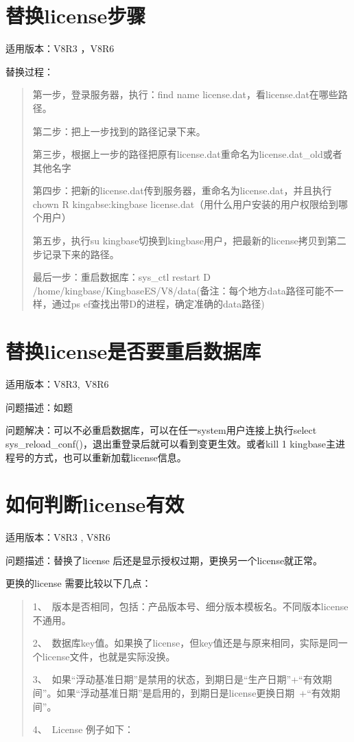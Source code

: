 \documentclass[letterpaper,10pt,english]{sphinxmanual}
\let\sphinxpxdimen\pdfpxdimen\else\newdimen\sphinxpxdimen
\begin{document}
\section{替换license步骤}
\label{\detokenize{license:id4}}
适用版本：V8R3 ，V8R6

替换过程：
\begin{quote}

第一步，登录服务器，执行：find \sphinxhyphen{}name license.dat，看license.dat在哪些路径。

第二步：把上一步找到的路径记录下来。

第三步，根据上一步的路径把原有license.dat重命名为license.dat\_old或者其他名字

第四步：把新的license.dat传到服务器，重命名为license.dat，并且执行chown \sphinxhyphen{}R kingabse:kingbase license.dat（用什么用户安装的用户权限给到哪个用户）

第五步，执行su \sphinxhyphen{}kingbase切换到kingbase用户，把最新的license拷贝到第二步记录下来的路径。

最后一步：重启数据库：sys\_ctl restart \sphinxhyphen{}D /home/kingbase/KingbaseES/V8/data(备注：每个地方data路径可能不一样，通过ps \sphinxhyphen{}ef查找出带\sphinxhyphen{}D的进程，确定准确的data路径)
\end{quote}


\section{替换license是否要重启数据库}
\label{\detokenize{license:id5}}
适用版本：V8R3, V8R6

问题描述：如题

问题解决：可以不必重启数据库，可以在任一system用户连接上执行select sys\_reload\_conf()，退出重登录后就可以看到变更生效。或者kill \sphinxhyphen{}1 kingbase主进程号的方式，也可以重新加载license信息。


\section{如何判断license有效}
\label{\detokenize{license:id6}}
适用版本：V8R3 , V8R6

问题描述：替换了license 后还是显示授权过期，更换另一个license就正常。

更换的license 需要比较以下几点：
\begin{quote}

1、 版本是否相同，包括：产品版本号、细分版本模板名。不同版本license不通用。

2、 数据库key值。如果换了license，但key值还是与原来相同，实际是同一个license文件，也就是实际没换。

3、 如果“浮动基准日期”是禁用的状态，到期日是“生产日期”+“有效期间”。如果“浮动基准日期”是启用的，到期日是license更换日期 +“有效期间”。

4、 License 例子如下：

\begin{figure}[htbp]
\centering

\noindent\sphinxincludegraphics[width=556\sphinxpxdimen,height=518\sphinxpxdimen]{{FAQ24011}.png}
\end{figure}
\end{quote}
\end{document}

